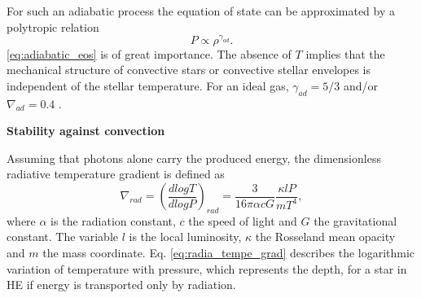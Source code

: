 For such an adiabatic process the equation of state can be approximated by a polytropic relation
\begin{equation}\label{eq:adiabatic_eos}
    P \propto \rho^{\gamma_{ad}}.
\end{equation}
\cref{eq:adiabatic_eos} is of great importance. The absence of $T$ implies that the mechanical structure of convective stars or convective stellar envelopes is independent of the stellar temperature. For an ideal gas, ${\gamma_{ad}} = 5/3$ and/or $\nabla_{ad} = 0.4$ \citep{pols2011stellar}.

{\bf Stability against convection}


Assuming that photons alone carry the produced energy, the dimensionless radiative temperature gradient is defined as
\begin{equation}\label{eq:radia_tempe_grad}
    \nabla_{rad} = \left ( \frac{d logT}{d logP} \right)_{rad} = \frac{3}{16 \pi \alpha c G} \frac{\kappa l P}{m T^4},
\end{equation}
where $\alpha$ is the radiation constant, $c$ the speed of light and $G$ the gravitational constant. The variable $l$ is the local luminosity, $\kappa$ the Rosseland mean opacity and $m$ the mass coordinate. Eq. \eqref{eq:radia_tempe_grad} describes the logarithmic variation of temperature with pressure, which represents the depth, for a star in HE if energy is transported only by radiation.

